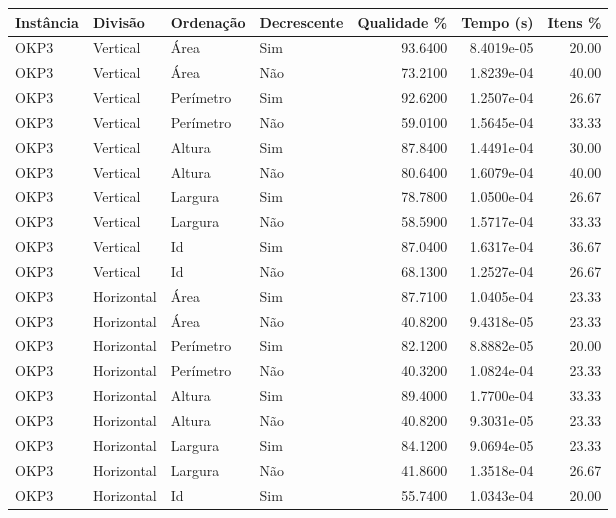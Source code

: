 \begin{tabular}{llllrrr}
\hline
Instância & Divisão     & Ordenação & Decrescente & Qualidade \% & Tempo (s)  & Itens \% \\
\hline
OKP3      & Vertical    & Área      & Sim         & 93.6400      & 8.4019e-05 & 20.00    \\
OKP3      & Vertical    & Área      & Não         & 73.2100      & 1.8239e-04 & 40.00    \\
OKP3      & Vertical    & Perímetro & Sim         & 92.6200      & 1.2507e-04 & 26.67    \\
OKP3      & Vertical    & Perímetro & Não         & 59.0100      & 1.5645e-04 & 33.33    \\
OKP3      & Vertical    & Altura    & Sim         & 87.8400      & 1.4491e-04 & 30.00    \\
OKP3      & Vertical    & Altura    & Não         & 80.6400      & 1.6079e-04 & 40.00    \\
OKP3      & Vertical    & Largura   & Sim         & 78.7800      & 1.0500e-04 & 26.67    \\
OKP3      & Vertical    & Largura   & Não         & 58.5900      & 1.5717e-04 & 33.33    \\
OKP3      & Vertical    & Id        & Sim         & 87.0400      & 1.6317e-04 & 36.67    \\
OKP3      & Vertical    & Id        & Não         & 68.1300      & 1.2527e-04 & 26.67    \\
OKP3      & Horizontal  & Área      & Sim         & 87.7100      & 1.0405e-04 & 23.33    \\
OKP3      & Horizontal  & Área      & Não         & 40.8200      & 9.4318e-05 & 23.33    \\
OKP3      & Horizontal  & Perímetro & Sim         & 82.1200      & 8.8882e-05 & 20.00    \\
OKP3      & Horizontal  & Perímetro & Não         & 40.3200      & 1.0824e-04 & 23.33    \\
OKP3      & Horizontal  & Altura    & Sim         & 89.4000      & 1.7700e-04 & 33.33    \\
OKP3      & Horizontal  & Altura    & Não         & 40.8200      & 9.3031e-05 & 23.33    \\
OKP3      & Horizontal  & Largura   & Sim         & 84.1200      & 9.0694e-05 & 23.33    \\
OKP3      & Horizontal  & Largura   & Não         & 41.8600      & 1.3518e-04 & 26.67    \\
OKP3      & Horizontal  & Id        & Sim         & 55.7400      & 1.0343e-04 & 20.00    \\

\end{tabular}
